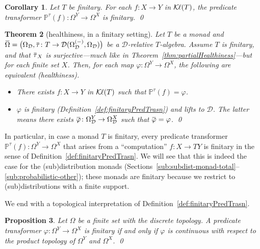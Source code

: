 \documentclass[9pt, preprint]{sigplanconf}
\theoremstyle{theorem}
\newtheorem{theorem}{Theorem}[section]
\newtheorem{proposition}[theorem]{Proposition}
\newtheorem{corollary}[theorem]{Corollary}
\theoremstyle{definition}
\newcommand{\cat}[1]{\mathcal{#1}}
\renewcommand{\bar}{\overbar}
\newcommand{\overbar}[1]{\mkern 1.5mu\overline{\mkern-1.5mu#1\mkern-1.5mu}\mkern 1.5mu}
\renewcommand{\phi}{\varphi}
\newcommand{\place}{{-}}
\newcommand{\Kl}{\mathcal{K}{\kern-.2ex}\ell}
\DeclarePairedDelimiter\p{(}{)}
\newcommand{\OmegaD}{\Omega_{\cat{D}}}
\newcommand{\bbP}{\mathbb{P}}
\begin{document}
\begin{corollary}
\label{cor:finitary-pred-transf}
  Let $T$ be finitary.
For each $f \colon X \to Y$ in $\Kl(T)$, the predicate transformer
  $\bbP^{\tau} (f) \colon \Omega^Y \to \Omega^X$
  is finitary.
\qed
\end{corollary}


\begin{theorem}[healthiness, in a finitary setting]
  \label{thm:finitary-healthiness}
  Let $T$ be a monad and
  $\bar{\Omega} =
    \p[\big]{\OmegaD, \bar{\tau} \colon T \to \cat{D}(\OmegaD^{(\place)}, \OmegaD)}$
  be a $\cat{D}$-relative $T$-algebra.
  Assume $T$ is finitary, and that $\bar{\tau}_X$ is surjective---much
 like
 in Theorem~\ref{thm:partialHealthiness}---but for each \emph{finite}
 set $X$. Then, for each map $\phi \colon \Omega^Y \to \Omega^X$,  the
 following are equivalent (healthiness).
 \begin{itemize}
  \item   There exists $f \colon X \to Y$ in $\Kl(T)$ such that
  $\bbP^{\tau}(f) = \phi$.
  \item
  $\phi$ is finitary (Definition~\ref{def:finitaryPredTrasn}) and lifts to $\cat{D}$. The latter means there
       exists $\bar{\phi} \colon \OmegaD^Y \to \OmegaD^X$
  such that $\bar{\phi} = \phi$. \qed
 \end{itemize}
\end{theorem}



\noindent
In particular, in case a monad $T$ is finitary, every
predicate transformer $\bbP^{\tau}(f) \colon \Omega^Y \to \Omega^X$ that arises
from a ``computation'' $f\colon X\to TY$ is finitary in the sense of
Definition~\ref{def:finitaryPredTrasn}. We will see that this is indeed the case for the
(sub)distribution monads (Sections~\ref{sub:subdist-monad-total}--\ref{sub:probabilistic-other}); these monads are finitary
because we restrict to (sub)distributions with a finite support.


We end with a topological interpretation of Definition~\ref{def:finitaryPredTrasn}.

\begin{proposition}
  \label{prop:finitary-continuous}
 Let $\Omega$ be a finite  set with the discrete topology.
 A predicate transformer $\phi \colon \Omega^Y \to \Omega^X$
  is finitary if and only if
  $\phi$ is  continuous with respect to the product topology of
 $\Omega^Y$ and $\Omega^X$.
 \qed
\end{proposition}
\end{document}
